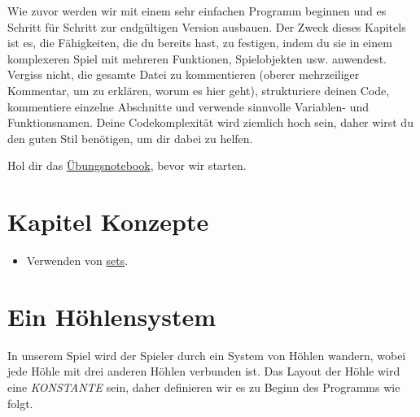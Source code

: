\documentclass[
]{book}
\providecommand{\tightlist}{%
  \setlength{\itemsep}{0pt}\setlength{\parskip}{0pt}}
\begin{document}
Wie zuvor werden wir mit einem sehr einfachen Programm beginnen und es Schritt für Schritt zur endgültigen Version ausbauen. Der Zweck dieses Kapitels ist es, die Fähigkeiten, die du bereits hast, zu festigen, indem du sie in einem komplexeren Spiel mit mehreren Funktionen, Spielobjekten usw. anwendest. Vergiss nicht, die gesamte Datei zu kommentieren (oberer mehrzeiliger Kommentar, um zu erklären, worum es hier geht), strukturiere deinen Code, kommentiere einzelne Abschnitte und verwende sinnvolle Variablen- und Funktionsnamen. Deine Codekomplexität wird ziemlich hoch sein, daher wirst du den guten Stil benötigen, um dir dabei zu helfen.

Hol dir das \href{notebooks/Hunt\%20the\%20Wumpus.ipynb}{Übungsnotebook}, bevor wir starten.

\hypertarget{kapitel-konzepte}{%
\section{Kapitel Konzepte}\label{kapitel-konzepte}}

\begin{itemize}
\tightlist
\item
  Verwenden von \protect\hyperlink{sets}{sets}.
\end{itemize}

\hypertarget{ein-huxf6hlensystem}{%
\section{Ein Höhlensystem}\label{ein-huxf6hlensystem}}

In unserem Spiel wird der Spieler durch ein System von Höhlen wandern, wobei jede Höhle mit drei anderen Höhlen verbunden ist. Das Layout der Höhle wird eine \emph{KONSTANTE} sein, daher definieren wir es zu Beginn des Programms wie folgt.
\end{document}

